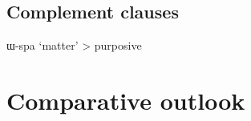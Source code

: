\documentclass[oldfontcommands,oneside,a4paper,11pt]{article}
\newcommand{\ipa}[1]{{\phon #1}} %
\begin{document}
   \subsection{Complement clauses}
   \ipa{ɯ-spa} `matter' > purposive \citet[212]{heine-kuteva02}
   
 
    \section{Comparative outlook} 




\end{document}
